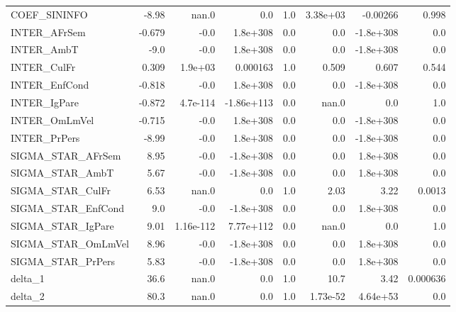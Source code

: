 \begin{tabular}{lrrrrrrr}
COEF\_SININFO       &    -8.98 &     nan.0 &        0.0 &      1.0 &      3.38e+03 &     -0.00266 &         0.998 \\
INTER\_AFrSem       &   -0.679 &      -0.0 &   1.8e+308 &      0.0 &           0.0 &    -1.8e+308 &           0.0 \\
INTER\_AmbT         &     -9.0 &      -0.0 &   1.8e+308 &      0.0 &           0.0 &    -1.8e+308 &           0.0 \\
INTER\_CulFr        &    0.309 &   1.9e+03 &   0.000163 &      1.0 &         0.509 &        0.607 &         0.544 \\
INTER\_EnfCond      &   -0.818 &      -0.0 &   1.8e+308 &      0.0 &           0.0 &    -1.8e+308 &           0.0 \\
INTER\_IgPare       &   -0.872 &  4.7e-114 & -1.86e+113 &      0.0 &         nan.0 &          0.0 &           1.0 \\
INTER\_OmLmVel      &   -0.715 &      -0.0 &   1.8e+308 &      0.0 &           0.0 &    -1.8e+308 &           0.0 \\
INTER\_PrPers       &    -8.99 &      -0.0 &   1.8e+308 &      0.0 &           0.0 &    -1.8e+308 &           0.0 \\
SIGMA\_STAR\_AFrSem  &     8.95 &      -0.0 &  -1.8e+308 &      0.0 &           0.0 &     1.8e+308 &           0.0 \\
SIGMA\_STAR\_AmbT    &     5.67 &      -0.0 &  -1.8e+308 &      0.0 &           0.0 &     1.8e+308 &           0.0 \\
SIGMA\_STAR\_CulFr   &     6.53 &     nan.0 &        0.0 &      1.0 &          2.03 &         3.22 &        0.0013 \\
SIGMA\_STAR\_EnfCond &      9.0 &      -0.0 &  -1.8e+308 &      0.0 &           0.0 &     1.8e+308 &           0.0 \\
SIGMA\_STAR\_IgPare  &     9.01 & 1.16e-112 &  7.77e+112 &      0.0 &         nan.0 &          0.0 &           1.0 \\
SIGMA\_STAR\_OmLmVel &     8.96 &      -0.0 &  -1.8e+308 &      0.0 &           0.0 &     1.8e+308 &           0.0 \\
SIGMA\_STAR\_PrPers  &     5.83 &      -0.0 &  -1.8e+308 &      0.0 &           0.0 &     1.8e+308 &           0.0 \\
delta\_1            &     36.6 &     nan.0 &        0.0 &      1.0 &          10.7 &         3.42 &      0.000636 \\
delta\_2            &     80.3 &     nan.0 &        0.0 &      1.0 &      1.73e-52 &     4.64e+53 &           0.0 \\
\bottomrule
\end{tabular}


